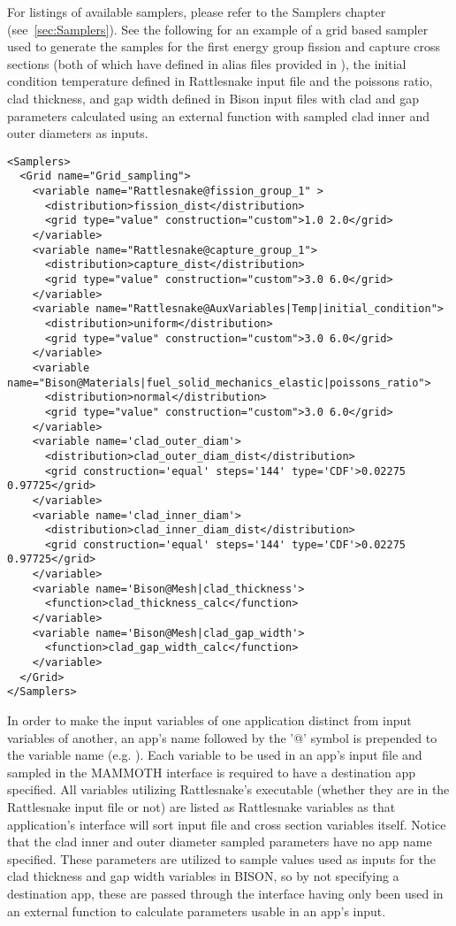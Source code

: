 For listings of available samplers, please refer to the Samplers chapter (see~\ref{sec:Samplers}).
See the following for an example of a grid based sampler used to generate the samples for
the first energy group fission and capture cross sections (both of which have
defined in alias files provided in ), the initial condition temperature defined in Rattlesnake
input file and the poissons ratio, clad thickness, and gap width defined in Bison input files with clad
and gap parameters calculated using an external function with sampled clad inner and outer diameters
as inputs.
%
\begin{lstlisting}[style=XML]
<Samplers>
  <Grid name="Grid_sampling">
    <variable name="Rattlesnake@fission_group_1" >
      <distribution>fission_dist</distribution>
      <grid type="value" construction="custom">1.0 2.0</grid>
    </variable>
    <variable name="Rattlesnake@capture_group_1">
      <distribution>capture_dist</distribution>
      <grid type="value" construction="custom">3.0 6.0</grid>
    </variable>
    <variable name="Rattlesnake@AuxVariables|Temp|initial_condition">
      <distribution>uniform</distribution>
      <grid type="value" construction="custom">3.0 6.0</grid>
    </variable>
    <variable name="Bison@Materials|fuel_solid_mechanics_elastic|poissons_ratio">
      <distribution>normal</distribution>
      <grid type="value" construction="custom">3.0 6.0</grid>
    </variable>
    <variable name='clad_outer_diam'>
      <distribution>clad_outer_diam_dist</distribution>
      <grid construction='equal' steps='144' type='CDF'>0.02275 0.97725</grid>
    </variable>
    <variable name='clad_inner_diam'>
      <distribution>clad_inner_diam_dist</distribution>
      <grid construction='equal' steps='144' type='CDF'>0.02275 0.97725</grid>
    </variable>
    <variable name='Bison@Mesh|clad_thickness'>
      <function>clad_thickness_calc</function>
    </variable>
    <variable name='Bison@Mesh|clad_gap_width'>
      <function>clad_gap_width_calc</function>
    </variable>
  </Grid>
</Samplers>
\end{lstlisting}
%
In order to make the input variables of one application distinct from input variables of another,
an app's name followed by the '@' symbol is prepended to the variable name (e.g. ).
Each variable to be used in an app's input file and sampled in the MAMMOTH interface is required
to have a destination app specified. All variables utilizing Rattlesnake's executable (whether
they are in the Rattlesnake input file or not) are listed as Rattlesnake variables
as that application's interface will sort input file and cross section
variables itself.  Notice that the clad inner and outer diameter sampled parameters have no app
name specified.  These parameters are utilized to sample values used as inputs
for the clad thickness and gap width variables in BISON, so by not specifying a destination
app, these are passed through the interface having only been used in an external function
to calculate parameters usable in an app's input.
